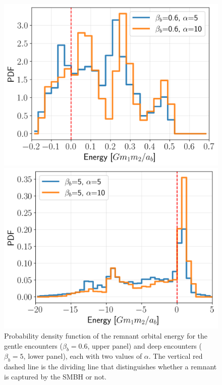 \documentclass[twocolumn]{aastex631}
\begin{document}
\begin{figure}[htbp]
        \subfigure
        {
            \begin{minipage}[b]{0.95\linewidth} 
                \centering
                \includegraphics[width=\columnwidth]{figures/remnant_E_distribution_lowbeta.png}
            \end{minipage}
        }
        \subfigure
        {
            \begin{minipage}[b]{0.95\linewidth}
                \centering
                \includegraphics[width=\columnwidth]{figures/remnant_E_distribution_largebeta.png}
            \end{minipage}
        }
        \caption{
        Probability density function of the remnant orbital energy for the gentle encounters ($\beta_b=0.6$, upper panel) and deep encounters ($\beta_b=5$, lower panel), each with two values of $\alpha$.
        The vertical red dashed line is the dividing line that distinguishes whether a remnant is captured by the SMBH or not.}
        \label{Fig:remnant_E}
\end{figure}
\end{document}
